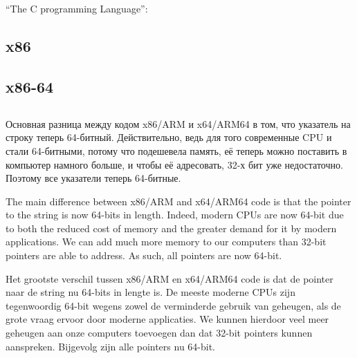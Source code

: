 \chapter{\HelloWorldSectionName}
\label{sec:helloworld}

``The C programming Language''\cite{Kernighan:1988:CPL:576122}:



\section{x86}


\ifdefined\IncludeGCC

\fi

\section{x86-64}

\ifdefined\IncludeGCC

\fi

\ifdefined\IncludeGCC

\fi
\ifdefined\IncludeARM

\fi
\ifdefined\IncludeMIPS

\fi

\section{\Conclusion{}}

\ifdefined\RUSSIAN
Основная разница между кодом x86/ARM и x64/ARM64 в том, что указатель на строку теперь 64-битный.
Действительно, ведь для того современные \ac{CPU} и стали 64-битными, потому что подешевела память,
её теперь можно поставить в компьютер намного больше, и чтобы её адресовать, 32-х бит уже
недостаточно.
Поэтому все указатели теперь 64-битные.
\fi

\ifdefined\ENGLISH
The main difference between x86/ARM and x64/ARM64 code is that the pointer to the string is now 64-bits in length.
Indeed, modern \ac{CPU}s are now 64-bit due to both the reduced cost of memory and the greater demand for it by modern applications. 
We can add much more memory to our computers than 32-bit pointers are able to address.
As such, all pointers are now 64-bit.
\fi

\ifdefined\DUTCH
Het grootste verschil tussen x86/ARM en x64/ARM64 code is dat de pointer naar de string nu 64-bits in lengte is.
De meeste moderne \ac{CPU}s zijn tegenwoordig 64-bit wegens zowel de verminderde gebruik van geheugen, als de grote vraag ervoor door moderne applicaties.
We kunnen hierdoor veel meer geheugen aan onze computers toevoegen dan dat 32-bit pointers kunnen aanspreken.
Bijgevolg zijn alle pointers nu 64-bit.
\fi

\ifdefined\IncludeExercises

\fi
